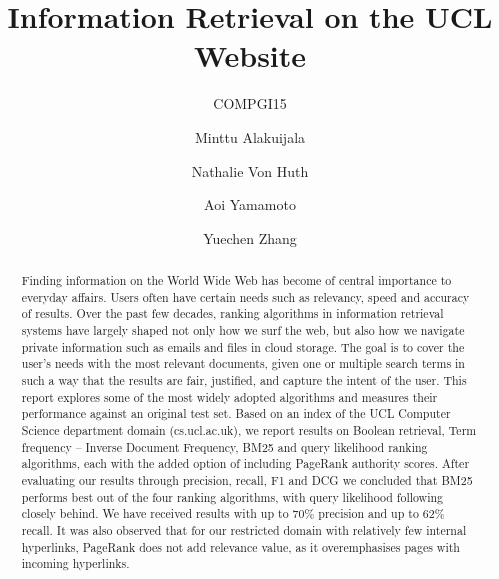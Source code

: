\documentclass[sigconf]{acmart}
\begin{document}
\title{Information Retrieval on the UCL Website}
\subtitle{COMPGI15}


\author{Minttu Alakuijala}
\affiliation{\institution{}}

\author{Nathalie Von Huth}
\affiliation{\institution{}}

\author{Aoi Yamamoto}
\affiliation{\institution{}}

\author{Yuechen Zhang}
\affiliation{\institution{}}



\begin{abstract}

Finding information on the World Wide Web has become of central importance to everyday affairs. Users often have certain needs such as relevancy, speed and accuracy of results. Over the past few decades, ranking algorithms in information retrieval systems have largely shaped not only how we surf the web, but also how we navigate private information such as emails and files in cloud storage. The goal is to cover the user's needs with the most relevant documents, given one or multiple search terms in such a way that the results are fair, justified, and capture the intent of the user. This report explores some of the most widely adopted algorithms and measures their performance against an original test set. Based on an index of the UCL Computer Science department domain (cs.ucl.ac.uk), we report results on Boolean retrieval, Term frequency -- Inverse Document Frequency, BM25 and query likelihood ranking algorithms, each with the added option of including PageRank authority scores. After evaluating our results through precision, recall, F1 and DCG we concluded that BM25 performs best out of the four ranking algorithms, with query likelihood following closely behind. We have received results with up to 70\% precision and up to 62\% recall. It was also observed that for our restricted domain with relatively few internal hyperlinks, PageRank does not add relevance value, as it overemphasises pages with incoming hyperlinks.

\end{abstract}

\maketitle




 
\end{document}
